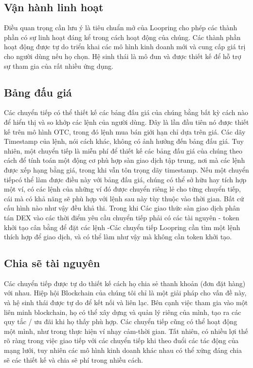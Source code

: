 \documentclass[12pt,a4paper]{article}
\begin{document}
\begin{multicols}{2}
\section{Vận hành linh hoạt\label{sec:business_model}}
Điều quan trọng cần lưu ý là tiêu chuẩn mở của Loopring cho phép các thành phần có sự linh hoạt đáng kể trong cách hoạt động của chúng. Các thành phần hoạt động được tự do triển khai các mô hình kinh doanh mới và cung cấp giá trị cho người dùng nếu họ chọn. Hệ sinh thái là mô đun và được thiết kế để hỗ trợ sự tham gia của rất nhiều ứng dụng.

\subsection{Bảng đấu giá\label{sec:order_book}}
Các chuyển tiếp có thể thiết kế các bảng đấu giá của chúng bằng bất kỳ cách nào để hiển thị và so khớp các lệnh của người dùng. Đây là lần đầu tiên nó được thiết kế trên mô hình OTC, trong đó lệnh mua bán giới hạn chỉ dựa trên giá. Các dãy Timestamp của lệnh, nói cách khác, không có ảnh hưởng đến bảng đấu giá. Tuy nhiên, một chuyển tiếp là miễn phí để thiết kế các bảng đấu giá của chúng theo cách để tính toán một động cơ phù hợp sàn giao dịch tập trung, nơi mà các lệnh được xếp hạng bằng giá, trong khi vẫn tôn trọng dãy timestamp. Nếu một chuyển tiếpcó thể làm được điều này với bảng đấu giá, chúng có thể sở hữu hay tích hợp một ví, có các lệnh của những ví đó được chuyển riêng lẻ cho từng chuyển tiếp, cái mà có khả năng sẽ phù hợp với lệnh sau này tùy thuộc vào thời gian. Bất cứ cấu hình nào như vậy đều khả thi.
Trong khi Các giao thức sàn giao dịch phân tán DEX vào các thời điểm yêu cầu chuyển tiếp phải có các tài nguyên - token khởi tạo cân bằng để đặt các lệnh -Các chuyển tiếp Loopring cần tìm một lệnh thích hợp để giao dịch, và có thể làm như vậy mà không cần token khởi tạo.

\subsection{Chia sẽ tài nguyên\label{sec:liquidity_sharing}}
Các chuyển tiếp được tự do thiết kế cách họ chia sẻ thanh khoản (đơn đặt hàng) với nhau. Hiệp hội Blockchain của chúng tôi chỉ là một giải pháp cho vấn đề này, và hệ sinh thái được tự do để kết nối và liên lạc. Bên cạnh việc tham gia vào một liên minh blockchain, họ có thể xây dựng và quản lý riêng của mình, tạo ra các quy tắc / ưu đãi khi họ thấy phù hợp. Các chuyển tiếp cũng có thể hoạt động một mình, như trong thực hiện ví nhạy cảm-thời gian. Tất nhiên, có nhiều lợi thế rõ ràng trong việc giao tiếp với các chuyển tiếp khi theo đuổi các tác động của mạng lưới, tuy nhiên các mô hình kinh doanh khác nhau có thể xứng đáng chia sẽ các thiết kế và chia sẽ phí trong nhiều cách.


\end{multicols}
\end{document}
